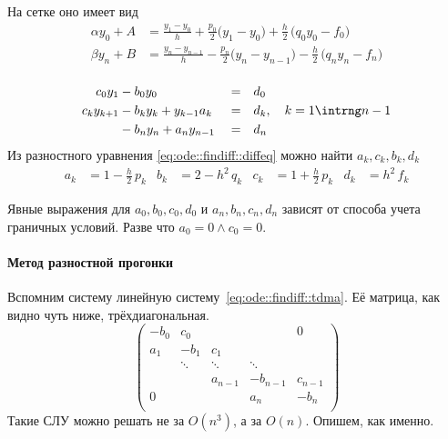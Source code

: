 \documentclass{trlnotes}
\begin{document}
\begin{enumerate}
        На сетке оно имеет вид
        \begin{equation*}
          \begin{split}
            α y_0 + A &= \frac{y_1 - y_{0}}{h} + \frac{p_0}{2} \biggl(y_1 - y_{0}\biggr)
            + \frac{h}{2}\,\biggl(q_0 y_0 - f_0\biggr) \\
            β y_n + B &= \frac{y_n - y_{n-1}}{h} - \frac{p_n}{2} \biggl(y_n - y_{n-1}\biggr)
            - \frac{h}{2}\,\biggl(q_n y_n - f_n\biggr) \\
            \end{split}
        \end{equation*}
\end{enumerate}

\begin{equation}\label{eq:ode::findiff::tdma}
  \begin{aligned}
    c_0 y_1     &- b_0 y_0                  &&=& &d_0 \\
    c_k y_{k+1} &- b_k y_k+ y_{k-1} a_k     &&=& &d_k,\quad k= 1\intrng n-1 \\
                &- b_n y_n + a_n y_{n-1}    &&=& &d_n 
  \end{aligned}
\end{equation}
Из разностного уравнения \eqref{eq:ode::findiff::diffeq} можно найти $a_k, c_k, b_k, d_k$
\[
  \begin{aligned}
    a_k &= 1- \tfrac{h}2 \, p_k &
    b_k &= 2- h^2 \, q_k &
    c_k &= 1+ \tfrac{h}2 \, p_k &
    d_k &= {h}^2 \, f_k 
  \end{aligned}
\]

Явные выражения для $a_0, b_0, c_0, d_0$ и $a_n, b_n, c_n, d_n$
зависят от способа учета граничных условий. Разве что $a_0 = 0\land c_0 = 0$.

\paragraph{Метод разностной прогонки}
\label{par:ode::fintdma}
Вспомним систему линейную систему~\ref{eq:ode::findiff::tdma}.
Её матрица, как видно чуть ниже, трёхдиагональная.
\[
  \begin{pmatrix}
    -b_0   & c_0    &         &          & 0       \\
    a_1    & -b_1   & c_1     &          &         \\
           & \ddots & \ddots  & \ddots             \\
           &        & a_{n-1} & -b_{n-1} & c_{n-1} \\
    0      &        &         & a_n      & -b_n    \\
  \end{pmatrix}
\]
Такие СЛУ можно решать не за $O(n^3)$, а за $O(n)$. Опишем, как именно.
\end{document}
